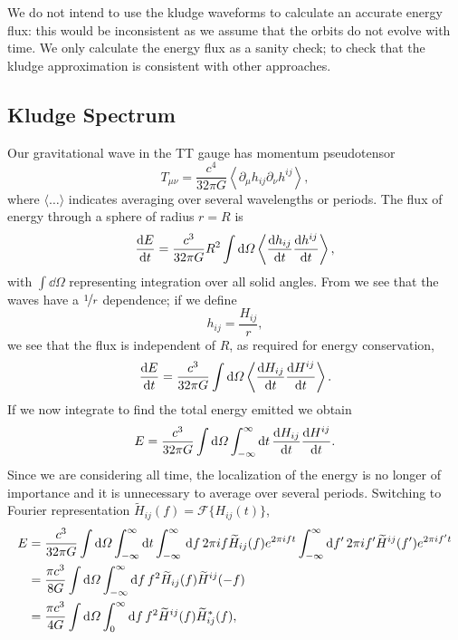 We do not intend to use the kludge waveforms to calculate an accurate energy flux: this would be inconsistent as we assume that the orbits do not evolve with time. We only calculate the energy flux as a sanity check; to check that the kludge approximation is consistent with other approaches.

\subsection{Kludge Spectrum}

Our gravitational wave in the TT gauge has momentum pseudotensor\cite{Misner1973}
\begin{equation}
T_{\mu\nu} = \frac{c^4}{32\pi G}\left\langle\partial_\mu h_{ij} \partial_\nu h^{ij}\right\rangle,
\end{equation}
where $\langle\ldots\rangle$ indicates averaging over several wavelengths or periods. The flux of energy through a sphere of radius $r = R$ is
\begin{equation}
\frac{\mathrm{d} {E}}{\mathrm{d} {t}} = \frac{c^3}{32\pi G} R^2 \int{\ensuremath{\mathrm{d}}\Omega}\left\langle\frac{\mathrm{d} {h_{ij}}}{\mathrm{d} {t}}\frac{\mathrm{d} {h^{ij}}}{\mathrm{d} {t}}\right\rangle,
\end{equation}
with $\int{\dd\Omega}$ representing integration over all solid angles. From  we see that the waves have a $\nicefrac{1}{r}$ dependence; if we define
\begin{equation}
h_{ij} = \frac{H_{ij}}{r},
\end{equation}
we see that the flux is independent of $R$, as required for energy conservation,
\begin{equation}
\frac{\mathrm{d} {E}}{\mathrm{d} {t}} = \frac{c^3}{32\pi G} \int{\ensuremath{\mathrm{d}}\Omega}\left\langle\frac{\mathrm{d} {H_{ij}}}{\mathrm{d} {t}}\frac{\mathrm{d} {H^{ij}}}{\mathrm{d} {t}}\right\rangle.
\end{equation}
If we now integrate to find the total energy emitted we obtain
\begin{equation}
E = \frac{c^3}{32\pi G} \int{\ensuremath{\mathrm{d}}\Omega}\int_{-\infty}^{\infty}{\mathrm{d} t} \, \frac{\mathrm{d} {H_{ij}}}{\mathrm{d} {t}}\frac{\mathrm{d} {H^{ij}}}{\mathrm{d} {t}}.
\end{equation}
Since we are considering all time, the localization of the energy is no longer of importance and it is unnecessary to average over several periods. Switching to Fourier representation $\widetilde{H}_{ij}(f) = \mathscr{F}\{H_{ij}(t)\}$,
\begin{align}
E = {} & \frac{c^3}{32\pi G} \int{\ensuremath{\mathrm{d}}\Omega}\int_{-\infty}^{\infty}{\mathrm{d} t}\int_{-\infty}^{\infty}{}\,\mathrm{d}{f} \, 2\pi i f \widetilde{H}_{ij}(f)e^{2\pi i f t}\int_{-\infty}^{\infty}{\mathrm{d} f'} \, 2\pi i f' \widetilde{H}^{ij}(f')e^{2\pi i f' t} \nonumber \\
 = {} & \frac{\pi c^3}{8 G} \int{\ensuremath{\mathrm{d}}\Omega}\int_{-\infty}^{\infty}{\mathrm{d} f} \, f^2 \widetilde{H}_{ij}(f)\widetilde{H}^{ij}(-f) \nonumber \\
 = {} & \frac{\pi c^3}{4 G} \int{\ensuremath{\mathrm{d}}\Omega}\int_{0}^{\infty}{\mathrm{d} f} \, f^2 \widetilde{H}^{ij}(f)\widetilde{H}_{ij}^*(f),
\end{align}
